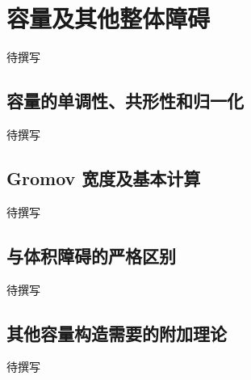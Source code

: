 
% 
% 
% 

\section{容量及其他整体障碍}
\label{g4:sec:2405}

待撰写

\subsection{容量的单调性、共形性和归一化}
\label{g4:subsec:2405:01}
待撰写

\subsection{Gromov 宽度及基本计算}
\label{g4:subsec:2405:02}
待撰写

\subsection{与体积障碍的严格区别}
\label{g4:subsec:2405:03}
待撰写

\subsection{其他容量构造需要的附加理论}
\label{g4:subsec:2405:04}
待撰写
